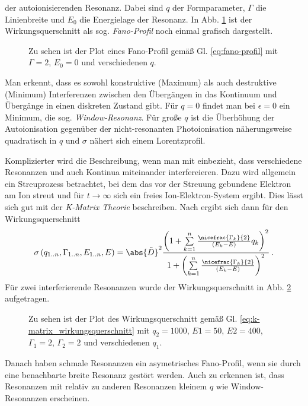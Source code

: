 der autoionisierenden Resonanz. Dabei sind $q$ der Formparameter, $\Gamma$ die
Linienbreite und $E_0$ die Energielage der Resonanz. In Abb. \ref{fig:fano} ist
der Wirkungsquerschnitt als sog. \textit{Fano-Profil} noch einmal grafisch
dargestellt.
\begin{figure}
	\centering
	\footnotesize
	
	\caption[Fano-Profil]{Zu sehen ist der Plot eines Fano-Profil gemäß Gl.
	\eqref{eq:fano-profil} mit $\Gamma=2$, $E_0=0$ und verschiedenen
	$q$.}\label{fig:fano}
\end{figure}
Man erkennt, dass es sowohl konstruktive (Maximum) als auch destruktive
(Minimum) Interferenzen zwischen den Übergängen in das Kontinuum und Übergänge
in einen diskreten Zustand gibt. Für $q=0$ findet man bei $\epsilon=0$ ein
Minimum, die sog. \textit{Window-Resonanz}. Für große $q$ ist die Überhöhung der
Autoionisation gegenüber der nicht-resonanten Photoionisation näherungsweise
quadratisch in $q$ und $\sigma$ nähert sich einem Lorentzprofil.\par
Komplizierter wird die Beschreibung, wenn man mit einbezieht, dass verschiedene
Resonanzen und auch Kontinua miteinander interfereieren. Dazu wird allgemein ein
Streuprozess betrachtet, bei dem das vor der Streuung gebundene Elektron am
Ion streut und für $t\to\infty$ sich ein freies Ion-Elektron-System ergibt. Dies
lässt sich gut mit der \textit{K-Matrix Theorie} beschreiben. Nach
\cite{connerade:1998:highly_excited_atoms} ergibt sich dann für den
Wirkungsquerschnitt
\begin{equation}\label{eq:k-matrix_wirkungsquerschnitt}
	\sigma\left(q_{1..n},\Gamma_{1..n},E_{1..n},E\right)=\abs{\tilde{D}}^2\frac{\left(1+\sum\limits_{k=1}^n{\frac{\nicefrac{\Gamma_k}{2}}{\left(E_k-E\right)}q_k}\right)^2}{1+\left(\sum\limits_{k=1}^n{\frac{\nicefrac{\Gamma_k}{2}}{\left(E_k-E\right)}}\right)^2}\,.
\end{equation}
Für zwei interferierende Resonanzen wurde der Wirkungsquerschnitt in Abb.
\ref{fig:k-matrix_wirkungsquerschnitt} aufgetragen.
\begin{figure}
	\centering
	\footnotesize
	
	\caption[Wirkungsquerschnitt - K-Matrix Theorie]{Zu sehen
	ist der Plot des Wirkungsquerschnitt gemäß Gl.
	\eqref{eq:k-matrix_wirkungsquerschnitt} mit $q_2=1000$, $E1=50$, $E2=400$, $\Gamma_1=2$, $\Gamma_2=2$ und
	verschiedenen $q_1$.}\label{fig:k-matrix_wirkungsquerschnitt}
\end{figure}
Danach haben schmale Resonanzen ein asymetrisches Fano-Profil, wenn sie durch
eine benachbarte breite Resonanz gestört werden. Auch zu erkennen ist, dass
Resonanzen mit relativ zu anderen Resonanzen kleinem $q$ wie Window-Resonanzen
erscheinen.

